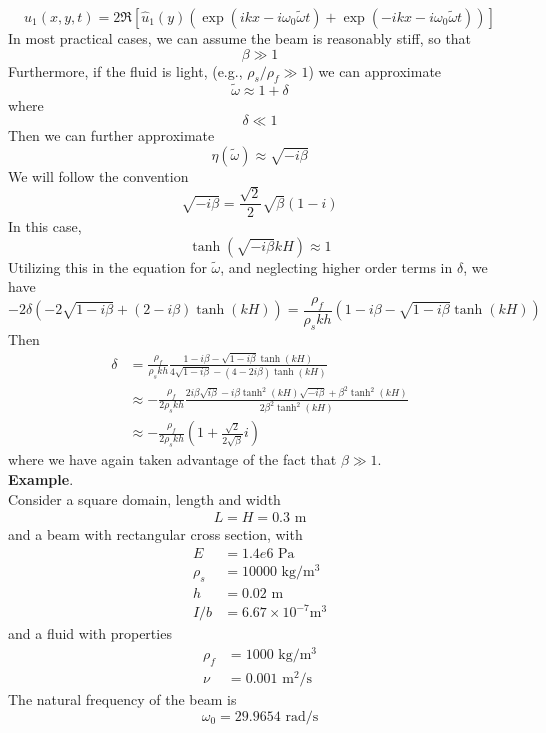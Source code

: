 \documentclass{article}
\begin{document}
\begin{equation}
u_1(x,y,t) = 2\Re\left[\hat{u}_1(y)\left(\exp(ikx-i\omega_0 \tilde{\omega}t)+\exp(-ikx-i\omega_0 \tilde{\omega}t)\right)\right]
\label{eq:eq2200} \end{equation}
In most practical cases, we can assume the beam is reasonably stiff, so that 
\[ \beta \gg 1 \]
Furthermore, if the fluid is light, (e.g., $\rho_s/\rho_f \gg 1$) we can approximate
\[ \tilde{\omega} \approx 1+\delta \]
where
\[ \delta \ll 1 \]
Then we can further approximate
\[ \eta(\tilde{\omega}) \approx \sqrt{-i\beta} \]
We will follow the convention
\[ \sqrt{-i\beta} = \frac{\sqrt{2}}{2}\sqrt{\beta}(1-i) \]
In this case, 
\[ \tanh(\sqrt{-i\beta}kH) \approx 1 \]
Utilizing this in the equation for $\tilde{\omega}$, and neglecting higher order terms in $\delta$, we have
\[-2\delta\left(-2\sqrt{1-i\beta}+(2-i\beta)\tanh(kH)\right) = \frac{\rho_f}{\rho_skh}(1-i\beta-\sqrt{1-i\beta}\tanh(kH)) \]
Then 
\begin{align}
\delta  &= \frac{\rho_f}{\rho_skh}\frac{1-i\beta-\sqrt{1-i\beta}\tanh(kH)}{4\sqrt{1-i\beta}-(4-2i\beta)\tanh(kH)} \nonumber \\
        &\approx -\frac{\rho_f}{2\rho_skh} \frac{2i\beta\sqrt{i\beta}-i\beta\tanh^2(kH)\sqrt{-i\beta}+\beta^2 \tanh^2 (kH)}{2\beta^2 \tanh^2 (kH)} \nonumber \\
        &\approx -\frac{\rho_f}{2\rho_skh}\left(1+\frac{\sqrt{2}}{2\sqrt{\beta}}i\right) \label{eq:eq2300}
\end{align}
where we have again taken advantage of the fact that $\beta \gg 1$. \\
{\bf Example}. \\
Consider a square domain, length and width
\begin{align*}
L = H = 0.3 \mbox{ m}
\end{align*}
and a beam with rectangular cross section, with
\begin{align*}
E &= 1.4e6 \mbox{ Pa} \\
\rho_s &= 10000 \mbox { kg/m$^3$}\\
h &= 0.02 \mbox { m} \\
I/b &= 6.67 \times 10^{-7} \mbox {m$^3$}
\end{align*}
and a fluid with properties
\begin{align*}
\rho_f &= 1000 \mbox { kg/m$^3$}\\
\nu &= 0.001 \mbox { m$^2$/s}
\end{align*}
The natural frequency of the beam is 
\[ \omega_0 = 29.9654 \mbox { rad/s} \]
\end{document}
